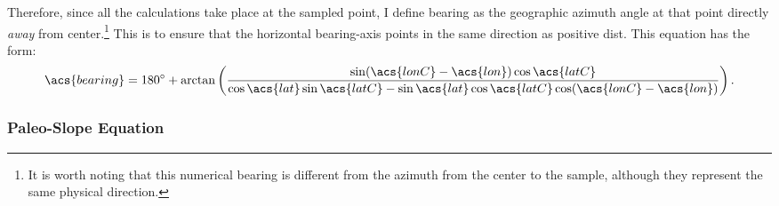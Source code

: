 Therefore, since all the calculations take place at the sampled point, I define \acs{bearing} as the geographic azimuth angle at that point directly \emph{away} from \acs{center}.\footnote{It is worth noting that this numerical bearing is different from the azimuth from the center to the sample, although they represent the same physical direction.} This is to ensure that the horizontal \acs{bearing}-axis points in the same direction as positive \acs{dist}. This equation \parencite{williams_aviation, veness_calculate} has the form:
\begin{equation}
    \acs{bearing} = \ang{180} + \arctan\left(\frac{\sin(\acs{lonC}-\acs{lon})\cos\acs{latC}} {\cos\acs{lat} \sin\acs{latC}-\sin\acs{lat}\cos\acs{latC}\cos(\acs{lonC}-\acs{lon})}\right).\label{eq:bearing}
\end{equation} 

\subsubsection{Paleo-Slope Equation}\label{sec:paleo-slope}

